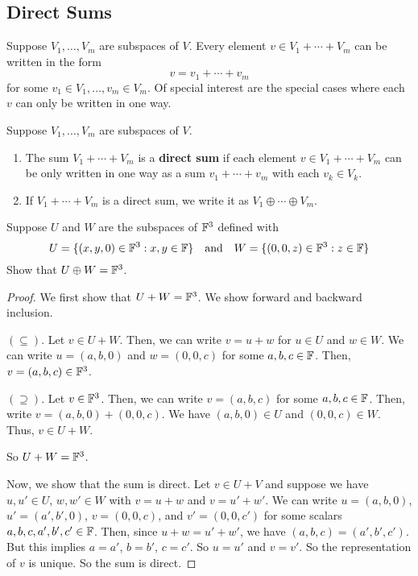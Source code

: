 \subsection*{Direct Sums}
Suppose $V_1, \dots, V_m$ are subspaces of $V$. Every element $v\in V_1 + \cdots + V_m$ can be written in the form
\[ v = v_1 + \cdots + v_m \]
for some $v_1\in V_1, \dots, v_m\in V_m$. Of special interest are the special cases where each $v$ can only be written in one way. 
\begin{definition}
    Suppose $V_1, \dots, V_m$ are subspaces of $V$.
    \begin{enumerate}
        \item The sum $V_1 + \cdots + V_m$ is a \textbf{direct sum} if each element $v\in V_1 + \cdots + V_m$ can be only written in one way as a sum $v_1 + \cdots + v_m$ with each $v_k \in V_k$.
        \item If $V_1 + \cdots + V_m$ is a direct sum, we write it as $V_1 \oplus \cdots \oplus V_m$.
    \end{enumerate}
\end{definition}
\begin{example}
    Suppose $U$ and $W$ are the subspaces of $\mathbb F^3$ defined with 
    \[ U = \{(x,y,0)\in \mathbb F^3: x,y\in \mathbb F\}\quad\text{and}\quad W = \{(0,0,z)\in \mathbb F^3: z\in \mathbb F\} \]
    Show that $U\oplus W = \mathbb F^3$.
\end{example}
\begin{proof}
    We first show that $U+W = \mathbb F^3$. We show forward and backward inclusion.

    $(\subseteq)$. Let $v \in U+W$. Then, we can write $v = u+w$ for $u\in U$ and $w\in W$. We can write $u = (a,b,0)$ and $w = (0,0,c)$ for some $a,b,c\in \mathbb F$. Then, $v = (a,b,c) \in \mathbb F^3$.

    $(\supseteq)$. Let $v\in \mathbb F^3$. Then, we can write $v = (a,b,c)$ for some $a,b,c\in \mathbb F$. Then, write $v = (a,b,0) + (0,0,c)$. We have $(a,b,0)\in U$ and $(0,0,c)\in W$. Thus, $v \in U +W$.

    So $U+W = \mathbb F^3$.

    Now, we show that the sum is direct. Let $v\in U+V$ and suppose we have $u, u' \in U$, $w, w'\in W$ with $v = u+w$ and $v = u' + w'$. We can write $u = (a,b,0)$, $u' = (a', b', 0)$, $v = (0,0,c)$, and $v'= (0,0,c')$ for some scalars $a,b,c,a',b',c'\in \mathbb F$. Then, since $u+w = u' + w'$, we have $(a,b,c) = (a',b',c')$. But this implies $a=a'$, $b=b'$, $c=c'$. So $u = u'$ and $v=v'$. So the representation of $v$ is unique. So the sum is direct.
\end{proof}
